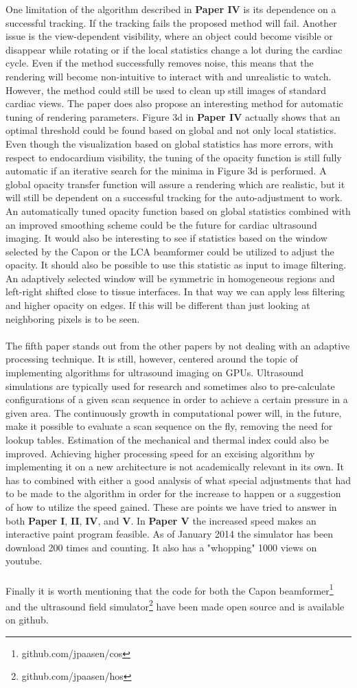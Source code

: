 One limitation of the algorithm described in \textbf{Paper IV} is its dependence on a successful tracking. If the tracking fails the proposed method will fail.  Another issue is the view-dependent visibility, where an object could become visible or disappear while rotating or if the local statistics change a lot during the cardiac cycle. Even if the method successfully removes noise, this means that the rendering will become non-intuitive to interact with and unrealistic to watch. However, the method could still be used to clean up still images of standard cardiac views. The paper does also propose an interesting method for automatic tuning of rendering parameters. Figure 3d in \textbf{Paper IV} actually shows that an optimal threshold could be found based on global and not only local statistics. Even though the visualization based on global statistics has more errors, with respect to endocardium visibility, the tuning of the opacity function is still fully automatic if an iterative search for the minima in Figure 3d is performed. A global opacity transfer function will assure a rendering which are realistic, but it will still be dependent on a successful tracking for the auto-adjustment to work. An automatically tuned opacity function based on global statistics combined with an improved smoothing scheme could be the future for cardiac ultrasound imaging. It would also be interesting to see if statistics based on the window selected by the Capon or the LCA beamformer could be utilized to adjust the opacity. It should also be possible to use this statistic as input to image filtering. An adaptively selected window will be symmetric in homogeneous regions and left-right shifted close to tissue interfaces. In that way we can apply less filtering and higher opacity on edges. If this will be different than just looking at neighboring pixels is to be seen.
\\\\
The fifth paper stands out from the other papers by not dealing with an adaptive processing technique. It is still, however, centered around the topic of implementing algorithms for ultrasound imaging on GPUs. Ultrasound simulations are typically used for research and sometimes also to pre-calculate configurations of a given scan sequence in order to achieve a certain pressure in a given area. The continuously growth in computational power will, in the future, make it possible to evaluate a scan sequence on the fly, removing the need for lookup tables. Estimation of the mechanical and thermal index could also be improved. Achieving higher processing speed for an excising algorithm by implementing it on a new architecture is not academically relevant in its own. It has to combined with either a good analysis of what special adjustments that had to be made to the algorithm in order for the increase to happen or a suggestion of how to utilize the speed gained. These are points we have tried to answer in both \textbf{Paper I}, \textbf{II},  \textbf{IV}, and \textbf{V}.  In \textbf{Paper V} the increased speed makes an interactive paint program feasible. As of January 2014 the simulator has been download 200 times and counting. It also has a "whopping" 1000 views on youtube. 
\\\\
Finally it is worth mentioning that the code for both the Capon beamformer\footnote{github.com/jpaasen/cos} and the ultrasound field simulator\footnote{github.com/jpaasen/hos} have been made open source and is available on github. 
\endinput